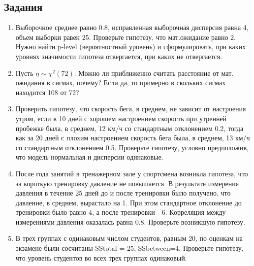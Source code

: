 \documentclass[12 pt]{article}
\begin{document}
\subsection*{Задания}
\begin{enumerate}
\item
Выборочное среднее равно 0.8, исправленная выборочная дисперсия равна 4, объем выборки равен 25. Проверьте гипотезу, что
мат.ожидание равно 2. Нужно найти p-level (вероятностный уровень) и сформулировать, при каких уровнях значимости
гипотеза отвергается, при каких не отвергается.
\item
Пусть $\eta\sim \chi^2(72)$. Можно ли приближенно считать расстояние от мат. ожидания в сигмах, почему?
Если да, то примерно в скольких сигмах находится 108 от 72?
\item
Проверить гипотезу, что скорость бега, в среднем, не зависит от настроения утром, если
в 10 дней с хорошем настроением скорость при утренней пробежке была, в среднем, 12 км/ч со стандартным отклонением 0.2,
тогда как за 20 дней с плохим настроением скорость бега была, в среднем, 13 км/ч со стандартным отклонением 0.5.
Проверьте гипотезу, условно предположив, что модель нормальная и дисперсии одинаковые.
\item
После года занятий в тренажерном зале у спортсмена возникла гипотеза, что за короткую тренировку давление не повышается.
В результате измерения давления в течение 25 дней до и после тренировки было получено, что давление, в среднем, вырастало на 1.
При этом стандартное отклонение до тренировки было равно 4, а после тренировки - 6. Корреляция между измерениями давления
оказалась равна 0.8. Проверьте возникшую гипотезу.
\item
В трех группах с одинаковым числом студентов, равным 20,
по оценкам на экзамене были сосчитаны SStotal = 25, SSbetween=4. Проверьте гипотезу, что уровень студентов
во всех трех группах одинаковый.
\end{enumerate}
\end{document}

